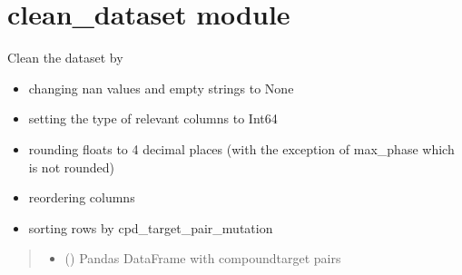 \documentclass[letterpaper,10pt,english]{sphinxmanual}
\begin{document}
\sphinxstepscope


\section{clean\_dataset module}
\label{\detokenize{clean_dataset:module-clean_dataset}}\label{\detokenize{clean_dataset:clean-dataset-module}}\label{\detokenize{clean_dataset::doc}}

\begin{fulllineitems}
\label{\detokenize{clean_dataset:clean_dataset.clean_dataset}}
\pysigstartsignatures
{}
\pysigstopsignatures
\sphinxAtStartPar
Clean the dataset by
\begin{itemize}
\item {} 
\sphinxAtStartPar
changing nan values and empty strings to None

\item {} 
\sphinxAtStartPar
setting the type of relevant columns to Int64

\item {} 
\sphinxAtStartPar
rounding floats to 4 decimal places (with the exception of max\_phase which is not rounded)

\item {} 
\sphinxAtStartPar
reordering columns

\item {} 
\sphinxAtStartPar
sorting rows by cpd\_target\_pair\_mutation

\end{itemize}
\begin{quote}\begin{description}
\begin{itemize}
\item {} 
\sphinxAtStartPar
{} () \textendash{} Pandas DataFrame with compound\sphinxhyphen{}target pairs


\end{itemize}
\end{description}
\end{quote}
\end{fulllineitems}
\end{document}
